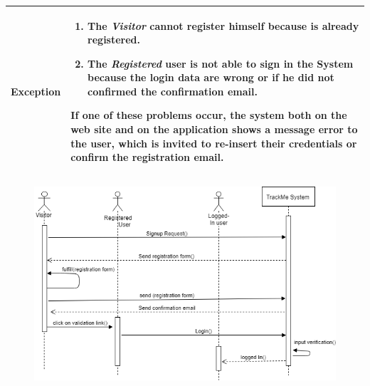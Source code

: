 \begin{table}[H]
\begin{tabular}{|p{3.5cm}|p{10.3cm}|}
    \hline
    \textbf{\large{Exception}} 			& \begin{enumerate}[leftmargin=0.5cm]
                                          	\item The \emph{Visitor} cannot register himself because is already registered.
                                          	\item The \emph{Registered} user is not able to sign in the System because the login data are wrong or if he did not confirmed  the confirmation email.
     \end{enumerate}
    										If one of these problems occur, the system both on the web site and on the application shows a message error to the user, which is invited to re-insert their credentials or confirm the registration email.\\
    
    \hline
    
    
    \end{tabular}
	
\end{table}
\begin{figure}[H]
    \centering
    \includegraphics[scale=0.4]{rasdL/Pictures/login1.png}
    
\end{figure}

